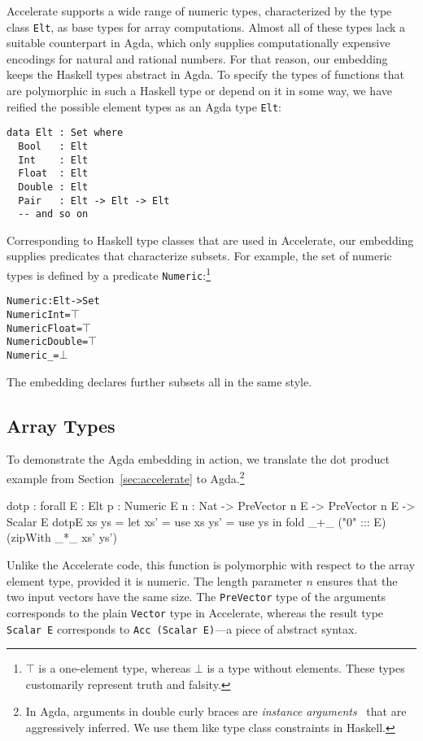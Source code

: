 \documentclass{llncs}
\begin{document}
Accelerate supports a wide range of numeric types, characterized by
the type class \texttt{Elt}, as base types for
array computations. Almost all of these types lack a suitable
counterpart in Agda, which only supplies  computationally expensive
encodings for natural and rational numbers. For that reason, our embedding keeps the Haskell types 
abstract in Agda. To specify the types of functions that are polymorphic in such a Haskell type or depend on it
in some way, we have reified the possible element types as an Agda type
\texttt{Elt}:
\begin{verbatim}
data Elt : Set where
  Bool   : Elt
  Int    : Elt
  Float  : Elt
  Double : Elt
  Pair   : Elt -> Elt -> Elt
  -- and so on
\end{verbatim}
Corresponding to Haskell type classes that are used in Accelerate, our
embedding supplies predicates that characterize subsets. For example,
the set of numeric types is defined by a predicate
\texttt{Numeric}:\footnote{$\top$ is a one-element type,
  whereas $\bot$ is a type without elements. These types customarily
  represent truth and falsity.}
\begin{alltt}
Numeric : Elt -> Set
Numeric Int = \(\top\)
Numeric Float = \(\top\)
Numeric Double = \(\top\)
Numeric _ = \(\bot\)
\end{alltt}
The embedding declares further subsets all in the same style.

\subsection{Array Types}
\label{sec:array-types}

To demonstrate the Agda embedding in action, we translate the
dot product example from Section~\ref{sec:accelerate} to Agda.\footnote{In Agda,
  arguments in double curly braces are \emph{instance
    arguments}~\cite{DevriesePiessens2011} that are aggressively
  inferred. We use them like type class constraints in Haskell.}
\begin{code}
dotp : forall {E : Elt} {{p : Numeric E}} {n : Nat}
     -> PreVector n E -> PreVector n E -> Scalar E
dotp{E} xs ys = 
  let xs' = use xs
      ys' = use ys
  in  fold _+_ ("0" ::: E) (zipWith _*_ xs' ys')
\end{code}
Unlike the Accelerate code, this function is polymorphic with respect
to the array element type, provided it is numeric.
The length parameter $n$ ensures that the two input
vectors have the same size. The \texttt{PreVector} type of the
arguments corresponds to the plain \texttt{Vector} type in Accelerate,
whereas the result type \texttt{Scalar E} corresponds to \texttt{Acc
  (Scalar E)}---a piece of abstract syntax. 
\end{document}
